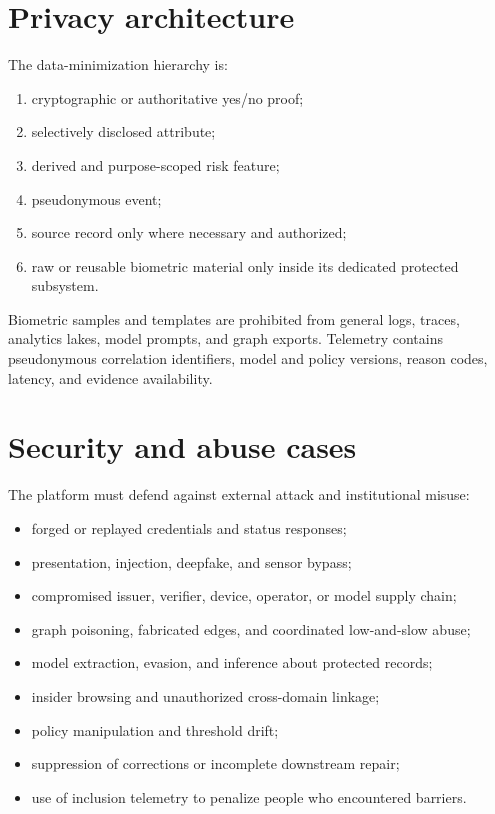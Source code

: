 \section{Privacy architecture}

The data-minimization hierarchy is:

\begin{enumerate}
\item cryptographic or authoritative yes/no proof;
\item selectively disclosed attribute;
\item derived and purpose-scoped risk feature;
\item pseudonymous event;
\item source record only where necessary and authorized;
\item raw or reusable biometric material only inside its dedicated protected subsystem.
\end{enumerate}

Biometric samples and templates are prohibited from general logs, traces, analytics lakes, model prompts, and graph exports. Telemetry contains pseudonymous correlation identifiers, model and policy versions, reason codes, latency, and evidence availability.

\section{Security and abuse cases}

The platform must defend against external attack and institutional misuse:

\begin{itemize}
\item forged or replayed credentials and status responses;
\item presentation, injection, deepfake, and sensor bypass;
\item compromised issuer, verifier, device, operator, or model supply chain;
\item graph poisoning, fabricated edges, and coordinated low-and-slow abuse;
\item model extraction, evasion, and inference about protected records;
\item insider browsing and unauthorized cross-domain linkage;
\item policy manipulation and threshold drift;
\item suppression of corrections or incomplete downstream repair;
\item use of inclusion telemetry to penalize people who encountered barriers.
\end{itemize}


